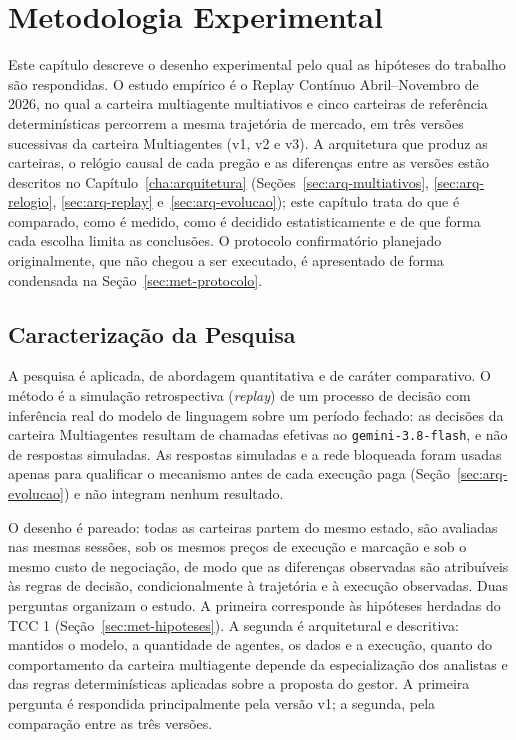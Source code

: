 \chapter{Metodologia Experimental}
\label{cha:metodologia}

Este capítulo descreve o desenho experimental pelo qual as hipóteses do trabalho são respondidas. O estudo empírico é o Replay Contínuo Abril--Novembro de 2026, no qual a carteira multiagente multiativos e cinco carteiras de referência determinísticas percorrem a mesma trajetória de mercado, em três versões sucessivas da carteira Multiagentes (v1, v2 e v3). A arquitetura que produz as carteiras, o relógio causal de cada pregão e as diferenças entre as versões estão descritos no Capítulo~\ref{cha:arquitetura} (Seções~\ref{sec:arq-multiativos}, \ref{sec:arq-relogio}, \ref{sec:arq-replay} e~\ref{sec:arq-evolucao}); este capítulo trata do que é comparado, como é medido, como é decidido estatisticamente e de que forma cada escolha limita as conclusões. O protocolo confirmatório planejado originalmente, que não chegou a ser executado, é apresentado de forma condensada na Seção~\ref{sec:met-protocolo}.

\section{Caracterização da Pesquisa}
\label{sec:met-caracterizacao}

A pesquisa é aplicada, de abordagem quantitativa e de caráter comparativo. O método é a simulação retrospectiva (\textit{replay}) de um processo de decisão com inferência real do modelo de linguagem sobre um período fechado: as decisões da carteira Multiagentes resultam de chamadas efetivas ao \texttt{gemini-3.8-flash}, e não de respostas simuladas. As respostas simuladas e a rede bloqueada foram usadas apenas para qualificar o mecanismo antes de cada execução paga (Seção~\ref{sec:arq-evolucao}) e não integram nenhum resultado.

O desenho é pareado: todas as carteiras partem do mesmo estado, são avaliadas nas mesmas sessões, sob os mesmos preços de execução e marcação e sob o mesmo custo de negociação, de modo que as diferenças observadas são atribuíveis às regras de decisão, condicionalmente à trajetória e à execução observadas. Duas perguntas organizam o estudo. A primeira corresponde às hipóteses herdadas do TCC 1 (Seção~\ref{sec:met-hipoteses}). A segunda é arquitetural e descritiva: mantidos o modelo, a quantidade de agentes, os dados e a execução, quanto do comportamento da carteira multiagente depende da especialização dos analistas e das regras determinísticas aplicadas sobre a proposta do gestor. A primeira pergunta é respondida principalmente pela versão v1; a segunda, pela comparação entre as três versões.

